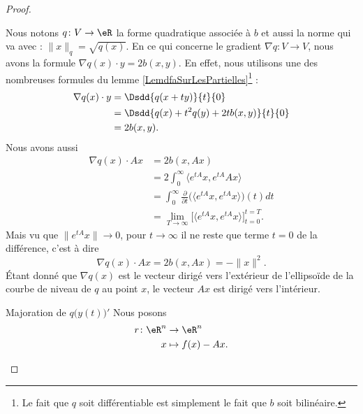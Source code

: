 \begin{proof}
\begin{subproof}
    Nous notons \( q\colon V\to \eR\) la forme quadratique associée à \( b\) et aussi la norme qui va avec : \( \| x \|_q=\sqrt{q(x)}\). En ce qui concerne le gradient \( \nabla q\colon V\to V\), nous avons la formule \( \nabla q(x)\cdot y=2b(x,y)\)\cite{MJEooXxBFFY}. En effet, nous utilisons une des nombreuses formules du lemme \ref{LemdfaSurLesPartielles}\footnote{Le fait que \( q\) soit différentiable est simplement le fait que \( b\) soit bilinéaire.} :
    \begin{subequations}
        \begin{align}
            \nabla q(x)\cdot y&=\Dsdd{ q(x+ty) }{t}{0}\\
            &=\Dsdd{ q(x)+t^2q(y)+2tb(x,y) }{t}{0}\\
            &=2b(x,y).
        \end{align}
    \end{subequations}
    Nous avons aussi
    \begin{subequations}
        \begin{align}
            \nabla q(x)\cdot Ax&=2b(x,Ax)\\
            &=2\int_0^{\infty}\langle  e^{tA}x,  e^{tA}Ax\rangle \\
            &=\int_0^{\infty}\frac{ \partial  }{ \partial t }\Big( \langle  e^{tA}x,  e^{tA}x\rangle  \Big)(t)dt\\
            &=\lim_{T\to \infty} \Big[ \langle  e^{tA}x,  e^{tA}x\rangle  \Big]_{t=0}^{t=T}.
        \end{align}
    \end{subequations}
    Mais vu que \( \|  e^{tA}x \|\to 0\), pour \( t\to \infty\) il ne reste que terme \( t=0\) de la différence, c'est à dire
    \begin{equation}    \label{EqUCOGooEFxZSO}
        \nabla q(x)\cdot Ax=2b(x,Ax)=-\| x \|^2.
    \end{equation}
    Étant donné que \( \nabla q(x)\) est le vecteur dirigé vers l'extérieur de l'ellipsoïde de la courbe de niveau de \( q\) au point \( x\), le vecteur \( Ax\) est dirigé vers l'intérieur.

\begin{center}
   
\end{center}


\item[Majoration de \(  q\big( y(t) \big)'  \)]
    Nous posons 
    \begin{equation}
        \begin{aligned}
            r\colon \eR^n&\to \eR^n \\
            x&\mapsto f(x)-Ax. 
        \end{aligned}
    \end{equation}


\end{subproof}
\end{proof}
